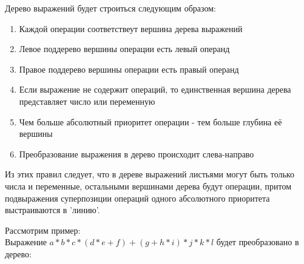 \documentclass[a4paper]{article}
\newcounter{i}
\begin{document}
\begin{enumerate}[label=\textbf{\arabic*}.]
{Дерево выражений будет строиться следующим образом:
\begin{enumerate}
    \item Каждой операции соответствеут вершина дерева выражений
    \item Левое поддерево вершины операции есть левый операнд
    \item Правое поддерево вершины операции есть правый операнд
    \item Если выражение не содержит операций, то единственная вершина дерева представляет число или переменную
    \item Чем больше абсолютный приоритет операции - тем больше глубина её вершины
    \item Преобразование выражения в дерево происходит слева-направо
\end{enumerate}

Из этих правил следует, что в дереве выражений листьями могут быть только числа и переменные, остальными вершинами 
дерева будут операции, притом подвыражения суперпозиции операций одного абсолютного приоритета выстраиваются в 'линию'.

Рассмотрим пример:\\
Выражение $a*b*c*(d*e+f)+(g+h*i)*j*k*l$ будет преобразовано в дерево:

\begin{center}
\end{center}}
\end{enumerate}
\end{document}
